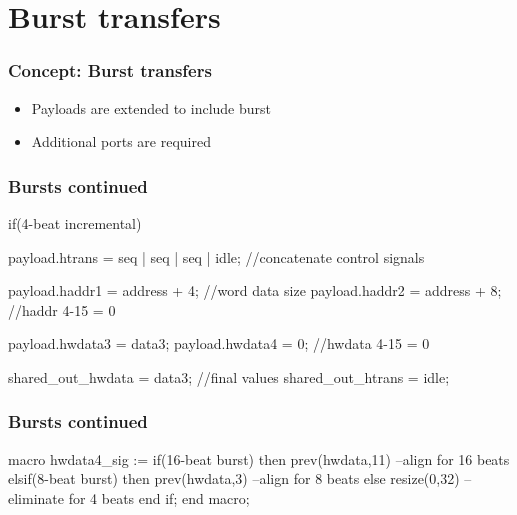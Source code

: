 \documentclass[]{beamer}
\begin{document}
\section{Burst transfers}
 \begin{frame}
  \frametitle{Concept: Burst transfers}
    \begin{itemize}
      \item<1-> Payloads are extended to include burst
      \item<2-> Additional ports are required 
    \end{itemize}  
 \end{frame}

 \begin{frame}[fragile]
   \frametitle{Bursts continued} 
 

\begin{C++}
if(4-beat incremental){
payload.htrans = seq | seq | seq | idle;
//concatenate control signals

payload.haddr1 = address + 4; //word data size
payload.haddr2 = address + 8;
//haddr 4-15 = 0

payload.hwdata3 = data3;
payload.hwdata4 = 0;
//hwdata 4-15 = 0

shared_out_hwdata = data3; //final values
shared_out_htrans = idle;  
}

\end{C++}

\end{frame}

\begin{frame}[fragile]
 \frametitle{Bursts continued} 
 
\begin{VHI}
macro hwdata4_sig := 
if(16-beat burst) then
prev(hwdata,11)  --align for 16 beats
elsif(8-beat burst) then
prev(hwdata,3)   --align for 8 beats
else
resize(0,32)     --eliminate for 4 beats
end if;
end macro;
\end{VHI}

 \end{frame}
\end{document}
